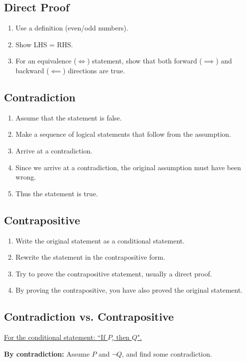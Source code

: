 \documentclass{article}
\theoremstyle{plain}
\numberwithin{theorem}{section}
\theoremstyle{definition}
\numberwithin{definition}{section}
\begin{document}
\subsection{Direct Proof}
\begin{enumerate}
    \item Use a definition (even/odd numbers).
    \item Show LHS = RHS.
    \item For an equivalence ($\iff$) statement, show that both forward ($\implies$) and backward ($\impliedby$) directions are true.
\end{enumerate}
%
\subsection{Contradiction}
\begin{enumerate}
    \item Assume that the statement is false.
    \item Make a sequence of logical statements that follow from the assumption.
    \item Arrive at a contradiction.
    \item Since we arrive at a contradiction, the original assumption must have been wrong.
    \item Thus the statement is true.
\end{enumerate}
%
\subsection{Contrapositive}
\begin{enumerate}
    \item Write the original statement as a conditional statement.
    \item Rewrite the statement in the contrapositive form.
    \item Try to prove the contrapositive statement, usually a direct proof.
    \item By proving the contrapositive, you have also proved the original statement.
\end{enumerate}
%
\subsection{Contradiction vs. Contrapositive}
\underline{For the conditional statement: ``If $P$, then $Q$".}

\noindent\textbf{By contradiction:} Assume $P$ and $\neg{Q}$, and find some contradiction.
\end{document}
